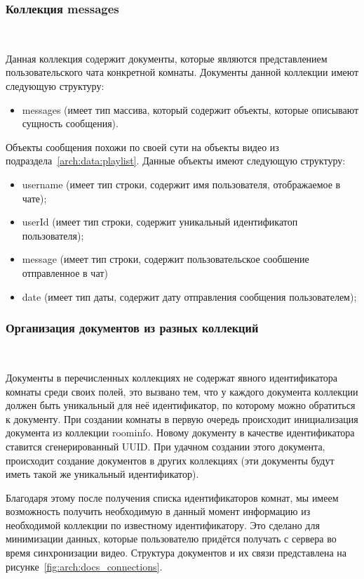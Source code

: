 \subsubsection{Коллекция messages}~\par
Данная коллекция содержит документы, которые являются представлением пользовательского чата конкретной комнаты. Документы данной коллекции имеют следующую структуру:
\begin{itemize}
 \item messages (имеет тип массива, который содержит объекты, которые описывают сущность сообщения).
\end{itemize}
 
Объекты сообщения похожи по своей сути на объекты видео из подраздела~\ref{arch:data:playlist}. Данные объекты имеют следующую структуру:
\begin{itemize}
 \item username (имеет тип строки, содержит имя пользователя, отображаемое в чате);
 \item userId (имеет тип строки, содержит уникальный идентификатоп пользователя);
 \item message (имеет тип строки, содержит пользовательское сообшение отправленное в чат)
 \item date (имеет тип даты, содержит дату отправления сообщения пользователем);
\end{itemize}
 
\subsubsection{Организация документов из разных коллекций}~\par
Документы в перечисленных коллекциях не содержат явного идентификатора комнаты среди своих полей, это вызвано тем, что у каждого документа коллекции должен быть уникальный для неё идентификатор, по которому можно обратиться к документу. 
При создании комнаты в первую очередь происходит инициализация документа из коллекции roominfo. 
Новому документу в качестве идентификатора ставится сгенерированный UUID. 
При удачном создании этого документа, происходит создание документов в других коллекциях (эти документы будут иметь такой же уникальный идентификатор).
 
Благодаря этому после получения списка идентификаторов комнат, мы имеем возможность получить необходимую в данный момент информацию из необходимой коллекции по известному идентификатору. 
Это сделано для минимизации данных, которые пользователю придётся получать с сервера во время синхронизации видео.
Структура документов и их связи представлена на рисунке~\ref{fig:arch:docs_connections}.
 
